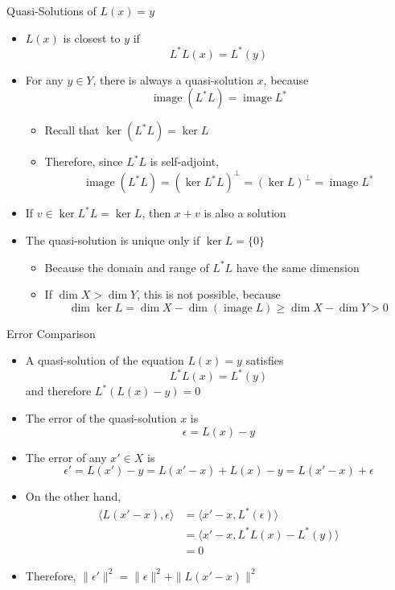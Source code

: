 \documentclass[usenames,dvipsnames,10pt]{beamer}
\newcommand\image{\operatorname{image}}
\begin{document}
\begin{frame}
  {Quasi-Solutions of $L(x) = y$}

  \begin{itemize}
  \item $L(x)$ is closest to $y$ if
    \[
      L^*L(x) = L^*(y)
    \]
  \item For any $y \in Y$, there is always a quasi-solution $x$, because
    \[
      \image (L^*L) = \image L^*
    \]
    \begin{itemize}
    \item Recall that $\ker (L^*L) = \ker L$
    \item Therefore, since $L^*L$ is self-adjoint,
      \[
        \image (L^*L) = (\ker L^*L)^\perp = (\ker L)^\perp = \image L^*
      \]
    \end{itemize}
  \item If $v \in \ker L^*L =\ker L$, then $x+v$ is also a solution
  \item The quasi-solution is unique only if $\ker L = \{0\}$
    \begin{itemize}
    \item Because the domain and range of $L^*L$ have the same dimension
    \item If $\dim X > \dim Y$, this is not possible, because
      \[
        \dim \ker L = \dim X - \dim (\image L) \ge \dim X - \dim Y > 0
      \]
    \end{itemize}
  \end{itemize}
\end{frame}

\begin{frame}
  {Error Comparison}

  \begin{itemize}
  \item A quasi-solution of the equation $L(x) = y$ satisfies
    \[
      L^*L(x) = L^*(y)
    \]
    and therefore $L^*(L(x) - y) = 0$
  \item The error of the quasi-solution $x$ is
    \[
      \epsilon = L(x) - y
    \]
  \item The error of any $x' \in X$ is
    \[
      \epsilon' = L(x')-y = L(x'-x) + L(x)-y = L(x'-x) + \epsilon
    \]
  \item On the other hand,
    \begin{align*}
      \langle L(x'-x), \epsilon\rangle &= \langle x'-x, L^*(\epsilon)\rangle\\
                                       &= \langle x'-x, L^*L(x) - L^*(y)\rangle\\
                                       &= 0
    \end{align*}
  \item Therefore, $\|\epsilon'\|^2 = \|\epsilon\|^2 + \|L(x'-x)\|^2$
  \end{itemize}
\end{frame}
\end{document}
